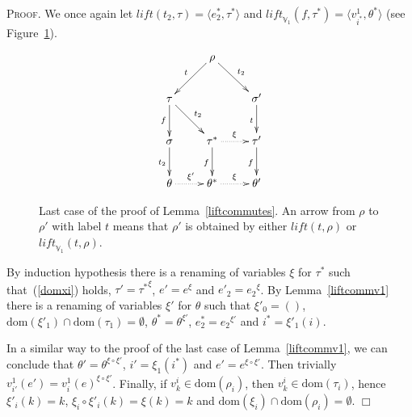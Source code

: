 \documentclass{article}
\newenvironment{proof}{\smallskip\textsc{Proof.}}{\hspace*{\fill}$\Box$}
\newcommand{\V}{{\mathbb V}}
\newcommand{\liftv}[1]{\ensuremath{\mathit{lift}_{\V_{#1}}}}
\newcommand{\lift}{\ensuremath{\mathit{lift}}}
\newcommand{\dom}{\ensuremath{\mathrm{dom}}}
\newcommand{\renamevar}[2]{\ensuremath{{#1}^{#2}}}
\newcommand{\isrenamevar}[3]{\ensuremath{{#1}=\renamevar{#2}{#3}}}
\newcommand{\idn}{()}
\begin{document}
\begin{proof}
We once again let $\lift(t_2,\tau)=\langle e^\ast_2,\tau^\ast\rangle$ and
$\liftv1(f,\tau^\ast)=\langle v^1_{i^\ast},\theta^\ast\rangle$ (see
Figure~\ref{fig:liftcommutes}).
\begin{figure}[htb]
\[\xymatrix{
 & \rho \ar[dl]_{t} \ar[dr]^{t_2} \\
 \tau \ar[d]_{f} \ar[dr]^{t_2} & & \sigma' \ar[d]_{t} \\
 \sigma \ar[d]_{t_2} & \tau^\ast \ar@{.>}[r]^{\xi} \ar[d]_{f}
 & \tau' \ar[d]_{f} \\
 \theta \ar@{.>}[r]^{\xi'} & \theta^\ast \ar@{.>}[r]^{\xi} & \theta' 
}\]
\caption{Last case of the proof of Lemma~\ref{liftcommutes}.  An arrow
from $\rho$ to $\rho'$ with label $t$ means that $\rho'$ is obtained
by either $\lift(t,\rho)$ or $\liftv1(t,\rho)$.}
\label{fig:liftcommutes}
\end{figure}
By induction hypothesis there is a renaming of variables $\xi$ for
$\tau^\ast$ such that~(\ref{domxi}) holds,
{\isrenamevar{\tau'}{\tau^\ast}\xi}, {\isrenamevar{e'}e\xi} and
{\isrenamevar{e'_2}{e_2}\xi}.  By Lemma~\ref{liftcommv1} there is a
renaming of variables $\xi'$ for $\theta$ such that $\xi'_0=\idn$,
$\dom(\xi'_1)\cap\dom(\tau_1)=\emptyset$,
{\isrenamevar{\theta^\ast}\theta{\xi'}},
{\isrenamevar{e^\ast_2}{e_2}{\xi'}} and $i^\ast=\xi'_1(i)$.

In a similar way to the proof of the last case of Lemma~\ref{liftcommv1},
we can conclude that {\isrenamevar{\theta'}\theta{\xi\circ\xi'}},
$i'=\xi_1(i^\ast)$ and {\isrenamevar{e'}e{\xi\circ\xi'}}.
Then trivially {\isrenamevar{v^1_{i'}(e')}{v^1_i(e)}{\xi\circ\xi'}}.
Finally, if $v^i_k\in\dom(\rho_i)$, then $v^i_k\in\dom(\tau_i)$,
hence $\xi'_i(k)=k$, $\xi_i\circ\xi'_i(k)=\xi(k)=k$ and
$\dom(\xi_i)\cap\dom(\rho_i)=\emptyset$.
\end{proof}
\end{document}
